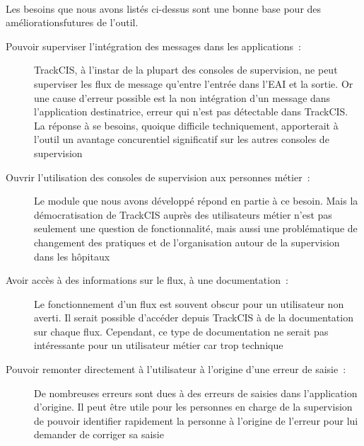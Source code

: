 			\paragraph{}%
			Les besoins que nous avons listés ci-dessus sont une bonne base pour des
			améliorationsfutures de l'outil.
			\begin{description}
				\item[Pouvoir superviser l'intégration des messages dans les applications~:]
				TrackCIS, à l'instar de la plupart des consoles de supervision, ne peut
				superviser les flux de message qu'entre l'entrée dans l'EAI et la sortie. Or
				une cause d'erreur possible est la non intégration d'un message dans
				l'application destinatrice, erreur qui n'est pas détectable dans TrackCIS.
				La réponse à se besoins, quoique difficile techniquement, apporterait à
				l'outil un avantage concurentiel significatif sur les autres consoles de
				supervision
				\item[Ouvrir l'utilisation des consoles de supervision aux personnes
				métier~:] Le module que nous avons développé répond en partie à ce besoin.
				Mais la démocratisation de TrackCIS auprès des utilisateurs métier n'est pas
				seulement une question de fonctionnalité, mais aussi une problématique de
				changement des pratiques et de l'organisation autour de la supervision dans
				les hôpitaux
				\item[Avoir accès à des informations sur le flux, à une documentation~:] Le
				fonctionnement d'un flux est souvent obscur pour un utilisateur non averti.
				Il serait possible d'accéder depuis TrackCIS à de la documentation sur
				chaque flux. Cependant, ce type de documentation ne serait pas intéressante
				pour un utilisateur métier car trop technique
				\item[Pouvoir remonter directement à l'utilisateur à l'origine d'une erreur
			  	de saisie~:] De nombreuses erreurs sont dues à des erreurs de saisies
			  	dans l'application d'origine. Il peut être utile pour les personnes en
			  	charge de la supervision de pouvoir identifier rapidement la personne à
			  	l'origine de l'erreur pour lui demander de corriger sa saisie
			\end{description}
			
